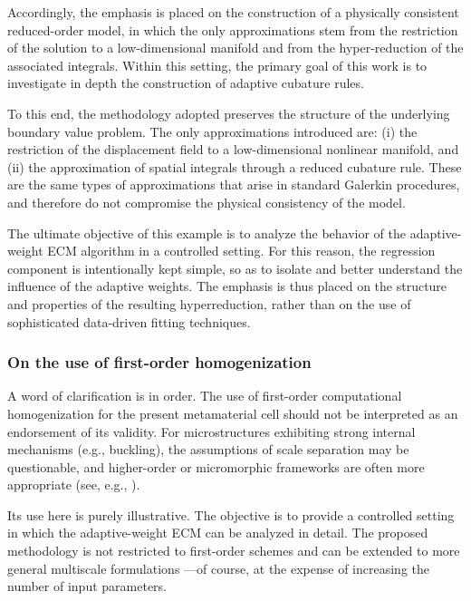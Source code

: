 \documentclass[11pt,a4paper]{article}
\newcommand{\PROMPT}[1]{ }
\begin{document}
Accordingly, the emphasis is placed on the construction of a physically
consistent reduced-order model, in which the only approximations stem from the
restriction of the solution to a low-dimensional manifold and from the
hyper-reduction of the associated integrals. Within this setting, the primary
goal of this work is to investigate in depth the construction of adaptive
cubature rules.

To this end, the methodology adopted preserves the structure of the underlying
boundary value problem. The only approximations introduced are: (i) the
restriction of the displacement field to a low-dimensional nonlinear manifold,
and (ii) the approximation of spatial integrals through a reduced cubature rule.
These are the same types of approximations that arise in standard Galerkin
procedures, and therefore do not compromise the physical consistency of the
model.

The ultimate objective of this example is to analyze the behavior of the
adaptive-weight ECM algorithm in a controlled setting. For this reason, the
regression component is intentionally kept simple, so as to isolate and better
understand the influence of the adaptive weights. The emphasis is thus placed on
the structure and properties of the resulting hyperreduction, rather than on the
use of sophisticated data-driven fitting techniques.

\PROMPT{}

\subsubsection{On the use of first-order homogenization}

A word of clarification is in order. The use of first-order computational
homogenization for the present metamaterial cell should not be interpreted as an
endorsement of its validity. For microstructures exhibiting strong internal
mechanisms (e.g., buckling), the assumptions of scale separation may be
questionable, and higher-order or micromorphic frameworks are often more
appropriate (see, e.g., \cite{biswas2020micromorphic}).

Its use here is purely illustrative. The objective is to provide a controlled
setting in which the adaptive-weight ECM can be analyzed in detail. The proposed
methodology is not restricted to first-order schemes and can be extended to more
general multiscale formulations ---of course, at the expense of increasing the number of input parameters.
\end{document}
